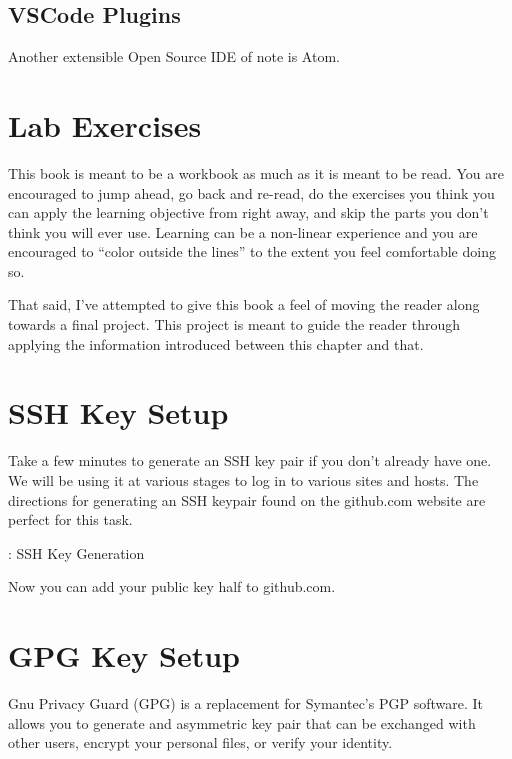 \subsection{VSCode Plugins}

\justify{}
Another extensible Open Source IDE of note is Atom.

\section{Lab Exercises}

\justify{}
This book is meant to be a workbook as much as it is meant to be read.
You are encouraged to jump ahead, go back and re-read, do the exercises
you think you can apply the learning objective from right away,
and skip the parts you don't think you will ever use. Learning can
be a non-linear experience and you
are encouraged to ``color outside the lines'' to the extent you feel
comfortable doing so.

\justify{}
That said, I've attempted to give this book a feel of moving the reader
along towards a final project.
This project is meant to guide the reader through applying the information
introduced between this chapter and that.
\section{SSH Key Setup}

\justify{}
Take a few minutes to generate an SSH key pair if you don't already have
one. We will be using it at various stages to log in to various sites
and hosts. The directions for generating an SSH keypair found on the
github.com website are perfect for this task.

\begin{mybox}{\thetcbcounter: SSH Key Generation}

\end{mybox}

\justify{}
Now you can add your public key half to github.com.

\section{GPG Key Setup}

\justify{}
Gnu Privacy Guard (GPG) is a replacement for Symantec's PGP software. It allows you
to generate and asymmetric key pair that can be exchanged with other users, encrypt your
personal files, or verify your identity.

